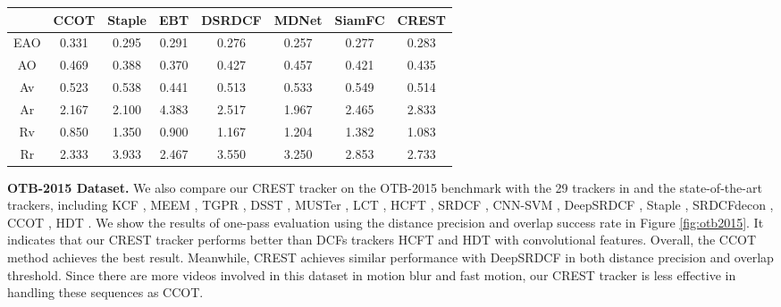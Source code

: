 \documentclass[10pt,twocolumn,letterpaper]{article}
\newcommand{\ryn}[1]{{\color{black}{#1}}}
\begin{document}
\def\pp{\hspace{0mm}}
\renewcommand{\tabcolsep}{15pt}
\begin{table*}[t]
\caption{Comparison with \ryn{the} state-of-the-art trackers on the VOT 2016 dataset. The results are presented in terms of expected average overlap (EAO), average overlap (AO), accuracy value (Av), accuracy rank (Ar), robustness value (Rv), and robustness rank (Rr).}
\centering
       \begin{tabular}{cccccccc}
        \toprule
        &\small{CCOT}&\small{Staple}&\small{EBT}&\small{DSRDCF}&\small{MDNet}&\small{SiamFC}&\small{CREST}\\
        \midrule
        \small{EAO}&\small{0.331}&\small{0.295}&\small{0.291}&\small{0.276}&\small{0.257}&\small{0.277}&\small{0.283}\\
        \small{AO}&\small{0.469}&\small{0.388}&\small{0.370}&\small{0.427}&\small{0.457}&\small{0.421}&\small{0.435}\\
        \small{Av}&\small{0.523}&\small{0.538}&\small{0.441}&\small{0.513}&\small{0.533}&\small{0.549}&\small{0.514}\\
        \small{Ar}&\small{2.167}&\small{2.100}&\small{4.383}&\small{2.517}&\small{1.967}&\small{2.465}&\small{2.833}\\
        \small{Rv}&\small{0.850}&\small{1.350}&\small{0.900}&\small{1.167}&\small{1.204}&\small{1.382}&\small{1.083}\\
        \small{Rr}&\small{2.333}&\small{3.933}&\small{2.467}&\small{3.550}&\small{3.250}&\small{2.853}&\small{2.733}\\
        \bottomrule
       \end{tabular}
\label{tab:vot}
\end{table*}


{\flushleft \bf OTB-2015 Dataset.}
We also compare our CREST tracker on the OTB-2015 benchmark \cite{wu-pami15-otb} with the 29 trackers in \cite{wu-cvpr13-otb} and the state-of-the-art trackers, including KCF \cite{Henriques-eccv12-DCF}, MEEM \cite{zhang-eccv14-meem}, TGPR \cite{gao-eccv14-transfer}, DSST \cite{martin-bmvc14-accurate}, MUSTer \cite{hong-cvpr15-muster}, LCT \cite{ma-cvpr15-lct}, HCFT \cite{chao-iccv15-HCF}, SRDCF \cite{martin-iccv15-learning}, CNN-SVM \cite{hong-icml15-cnnsvm}, DeepSRDCF \cite{Danelljan-iccvw15-DeepSRDCF}, Staple \cite{bertinetto-cvpr16-staple}, SRDCFdecon \cite{danelljan-CVPR16-adaptive}, CCOT \cite{martin-eccv16-beyond}, HDT \cite{qi-cvpr16-hdt}. We show the results of one-pass evaluation using the distance precision and overlap success rate in Figure \ref{fig:otb2015}. It indicates that our CREST tracker performs better than DCFs trackers HCFT and HDT with convolutional features. Overall, the CCOT method achieves the best result. Meanwhile, CREST achieves similar performance with DeepSRDCF in both distance precision and overlap threshold. Since there are more videos involved in this dataset in motion blur and fast motion, our CREST tracker is less effective in handling these sequences as CCOT.
\end{document}
